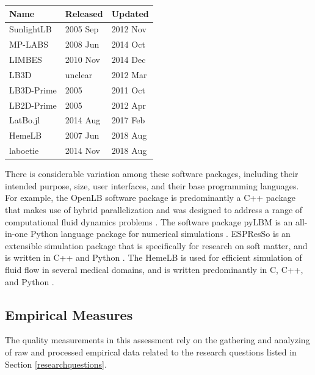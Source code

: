 \documentclass[12pt, notitlepage]{article}
\begin{document}
\begin{center}
	\begin{tabular}{ p{4cm}p{3cm}p{3cm} }
		\hline
		Name & Released & Updated\\
		\hline
		SunlightLB & 2005 Sep & 2012 Nov\\
		MP-LABS & 2008 Jun & 2014 Oct\\
		LIMBES & 2010 Nov & 2014 Dec\\
		LB3D & unclear & 2012 Mar\\
		LB3D-Prime & 2005 & 2011 Oct\\
		LB2D-Prime & 2005 & 2012 Apr\\
		LatBo.jl & 2014 Aug & 2017 Feb\\
		HemeLB & 2007 Jun & 2018 Aug\\
		laboetie & 2014 Nov & 2018 Aug\\
		\hline
	\end{tabular}
	\label{deadpackages}
\end{center}

There is considerable variation among these software packages, including their intended purpose, size, user interfaces, and their base programming languages. For example, the OpenLB software package is predominantly a C++ package that makes use of hybrid parallelization and was designed to address a range of computational fluid dynamics problems \citep{heuveline2009towards}. The software package pyLBM is an all-in-one Python language package for numerical simulations \citep{graille2017pylbm}. ESPResSo is an extensible simulation package that is specifically for research on soft matter, and is written in C++ and Python \citep{weik2019espresso}. The HemeLB is used for efficient simulation of fluid flow in several medical domains, and is written predominantly in C, C++, and Python \citep{mazzeo2008hemelb}. 

\subsection{Empirical Measures}\label{empiricalmeasures}

The quality measurements in this assessment rely on the gathering and analyzing of raw and processed empirical data related to the research questions listed in Section \ref{researchquestions}. 
\end{document}
